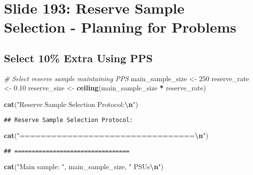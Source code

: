 \documentclass[
]{article}
\newenvironment{Shaded}{\begin{snugshade}}{\end{snugshade}}
\newcommand{\CommentTok}[1]{\textcolor[rgb]{0.56,0.35,0.01}{\textit{#1}}}
\newcommand{\DecValTok}[1]{\textcolor[rgb]{0.00,0.00,0.81}{#1}}
\newcommand{\FloatTok}[1]{\textcolor[rgb]{0.00,0.00,0.81}{#1}}
\newcommand{\FunctionTok}[1]{\textcolor[rgb]{0.13,0.29,0.53}{\textbf{#1}}}
\newcommand{\NormalTok}[1]{#1}
\newcommand{\OtherTok}[1]{\textcolor[rgb]{0.56,0.35,0.01}{#1}}
\newcommand{\SpecialCharTok}[1]{\textcolor[rgb]{0.81,0.36,0.00}{\textbf{#1}}}
\newcommand{\StringTok}[1]{\textcolor[rgb]{0.31,0.60,0.02}{#1}}
\begin{document}
\section{Slide 193: Reserve Sample Selection - Planning for
Problems}\label{slide-193-reserve-sample-selection---planning-for-problems}

\subsection{Select 10\% Extra Using
PPS}\label{select-10-extra-using-pps}

\begin{Shaded}
\begin{Highlighting}[]
\CommentTok{\# Select reserve sample maintaining PPS}
\NormalTok{main\_sample\_size }\OtherTok{\textless{}{-}} \DecValTok{250}
\NormalTok{reserve\_rate }\OtherTok{\textless{}{-}} \FloatTok{0.10}
\NormalTok{reserve\_size }\OtherTok{\textless{}{-}} \FunctionTok{ceiling}\NormalTok{(main\_sample\_size }\SpecialCharTok{*}\NormalTok{ reserve\_rate)}

\FunctionTok{cat}\NormalTok{(}\StringTok{"Reserve Sample Selection Protocol:}\SpecialCharTok{\textbackslash{}n}\StringTok{"}\NormalTok{)}
\end{Highlighting}
\end{Shaded}

\begin{verbatim}
## Reserve Sample Selection Protocol:
\end{verbatim}

\begin{Shaded}
\begin{Highlighting}[]
\FunctionTok{cat}\NormalTok{(}\StringTok{"=================================}\SpecialCharTok{\textbackslash{}n}\StringTok{"}\NormalTok{)}
\end{Highlighting}
\end{Shaded}

\begin{verbatim}
## =================================
\end{verbatim}

\begin{Shaded}
\begin{Highlighting}[]
\FunctionTok{cat}\NormalTok{(}\StringTok{"Main sample: "}\NormalTok{, main\_sample\_size, }\StringTok{" PSUs}\SpecialCharTok{\textbackslash{}n}\StringTok{"}\NormalTok{)}
\end{Highlighting}
\end{Shaded}
\end{document}
